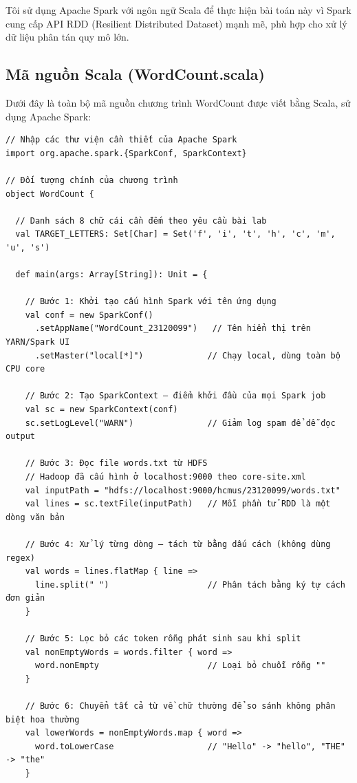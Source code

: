 \documentclass[12pt]{article}
\begin{document}
Tôi sử dụng Apache Spark với ngôn ngữ Scala để thực hiện bài toán này vì Spark cung
cấp API RDD (Resilient Distributed Dataset) mạnh mẽ, phù hợp cho xử lý dữ liệu
phân tán quy mô lớn.

\subsection{Mã nguồn Scala (WordCount.scala)}

Dưới đây là toàn bộ mã nguồn chương trình WordCount được viết bằng Scala, sử dụng
Apache Spark:

\begin{verbatim}
// Nhập các thư viện cần thiết của Apache Spark
import org.apache.spark.{SparkConf, SparkContext}

// Đối tượng chính của chương trình
object WordCount {

  // Danh sách 8 chữ cái cần đếm theo yêu cầu bài lab
  val TARGET_LETTERS: Set[Char] = Set('f', 'i', 't', 'h', 'c', 'm', 'u', 's')

  def main(args: Array[String]): Unit = {

    // Bước 1: Khởi tạo cấu hình Spark với tên ứng dụng
    val conf = new SparkConf()
      .setAppName("WordCount_23120099")   // Tên hiển thị trên YARN/Spark UI
      .setMaster("local[*]")             // Chạy local, dùng toàn bộ CPU core

    // Bước 2: Tạo SparkContext — điểm khởi đầu của mọi Spark job
    val sc = new SparkContext(conf)
    sc.setLogLevel("WARN")               // Giảm log spam để dễ đọc output

    // Bước 3: Đọc file words.txt từ HDFS
    // Hadoop đã cấu hình ở localhost:9000 theo core-site.xml
    val inputPath = "hdfs://localhost:9000/hcmus/23120099/words.txt"
    val lines = sc.textFile(inputPath)   // Mỗi phần tử RDD là một dòng văn bản

    // Bước 4: Xử lý từng dòng — tách từ bằng dấu cách (không dùng regex)
    val words = lines.flatMap { line =>
      line.split(" ")                    // Phân tách bằng ký tự cách đơn giản
    }

    // Bước 5: Lọc bỏ các token rỗng phát sinh sau khi split
    val nonEmptyWords = words.filter { word =>
      word.nonEmpty                      // Loại bỏ chuỗi rỗng ""
    }

    // Bước 6: Chuyển tất cả từ về chữ thường để so sánh không phân biệt hoa thường
    val lowerWords = nonEmptyWords.map { word =>
      word.toLowerCase                   // "Hello" -> "hello", "THE" -> "the"
    }


\end{verbatim}
\end{document}
